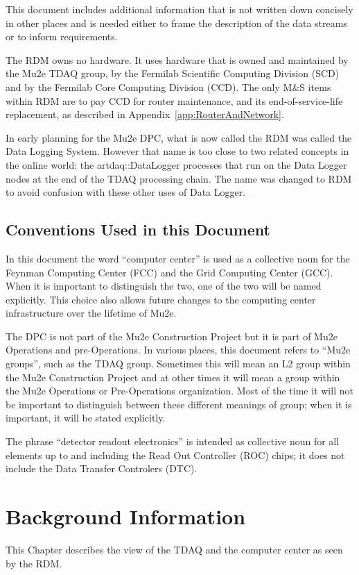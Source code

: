 This document includes additional information that is not written down concisely
in other places and is needed either to frame the description of the data streams
or to inform requirements.


The RDM owns no hardware.  It uses hardware that is owned and maintained
by the Mu2e TDAQ group,
by the Fermilab Scientific Computing Division (SCD)
and by the Fermilab Core Computing Division (CCD).
The only M\&S items within RDM are to pay CCD for router maintenance,
and its end-of-service-life replacement, as described in Appendix~\ref{app:RouterAndNetwork}.

In early planning for the Mu2e DPC, what is now called the RDM was called the Data Logging System.
However that name is too close to two related concepts in the online world:
the {\code artdaq::DataLogger} processes that run on the Data Logger nodes at the end of the TDAQ
processing chain.  The name was changed to RDM to avoid confusion with these other uses of Data Logger.

\section{Conventions Used in this Document}

In this document the word ``computer center'' is used as a collective noun for the
Feynman Computing Center (FCC) and the Grid Computing Center (GCC).
When it is important to distinguish the two, one of the two will be named explicitly.
This choice also allows future changes to the computing center infrastructure over the
lifetime of Mu2e.

The DPC is not part of the Mu2e Construction Project but it is part of Mu2e Operations
and pre-Operations.
In various places, this document refers to ``Mu2e groups'', such as the TDAQ group.
Sometimes this will mean an L2 group within the Mu2e Construction Project and at other
times it will mean a group within the Mu2e Operations or Pre-Operations organization.
Most of the time it will not be important to distinguish between these different meanings
of group; when it is important, it will be stated explicitly.

The phrase ``detector readout electronics'' is intended as collective noun for all elements
up to and including the Read Out Controller (ROC) chips; it does not include
the Data Transfer Controlers (DTC).


\chapter{Background Information}
\label{chap:BackgroundInfo}
This Chapter describes the view of the TDAQ and the computer center as seen by the RDM.

